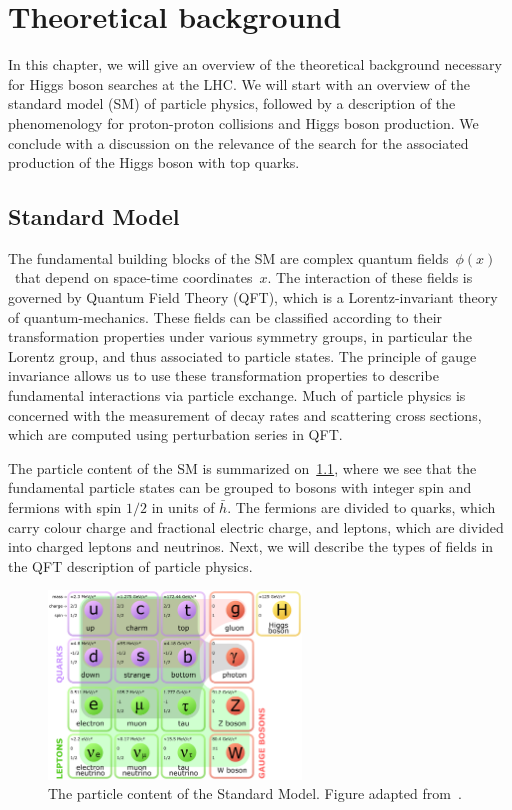 \chapter{Theoretical background}
In this chapter, we will give an overview of the theoretical background necessary for Higgs boson searches at the LHC. We will start with an overview of the standard model (SM) of particle physics, followed by a description of the phenomenology for proton-proton collisions and Higgs boson production. We conclude with a discussion on the relevance of the search for the associated production of the Higgs boson with top quarks.

\section{Standard Model}
The fundamental building blocks of the SM are complex quantum fields~$\phi(x)$~that depend on space-time coordinates~$x$. The interaction of these fields is governed by Quantum Field Theory (QFT), which is a Lorentz-invariant theory of quantum-mechanics. These fields can be classified according to their transformation properties under various symmetry groups, in particular the Lorentz group, and thus associated to particle states. The principle of gauge invariance allows us to use these transformation properties to describe fundamental interactions via particle exchange. Much of particle physics is concerned with the measurement of decay rates and scattering cross sections, which are computed using perturbation series in QFT.

The particle content of the SM is summarized on~\cref{fig:standard_model}, where we see that the fundamental particle states can be grouped to bosons with integer spin and fermions with spin $1/2$ in units of $\bar{h}$. The fermions are divided to quarks, which carry colour charge and fractional electric charge, and leptons, which are divided into charged leptons and neutrinos. Next, we will describe the types of fields in the QFT description of particle physics.

\begin{figure}
\begin{centering}
\includegraphics[width=0.6\textwidth]{figures/theory/Standard_Model_of_Elementary_Particles_modified_version.eps}
\caption[The particle content of the Standard Model]{The particle content of the Standard Model. Figure adapted from~\cite{wikipediaSM}.}
\label{fig:standard_model}
\end{centering}
\end{figure}


